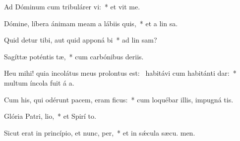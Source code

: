 \item Ad Dóminum cum tribulárer vi:~* et vit me.
\item Dómine, líbera ánimam meam a lábiis quis,~* et a lin sa.
\item Quid detur tibi, aut quid apponá bi~* ad lin sam?
\item Sagíttæ poténtis tæ,~* cum carbónibus deriis.
\item Heu mihi! quia incolátus meus prolontus est:~\pscross{} habitávi cum habitánti dar:~* multum íncola fuit á a.
\item Cum his, qui odérunt pacem, eram ficus:~* cum loquébar illis, impugná  tis.
\item Glória Patri,  lio,~* et Spirí to.
\item Sicut erat in princípio, et nunc,  per,~* et in sǽcula sæcu. men.
